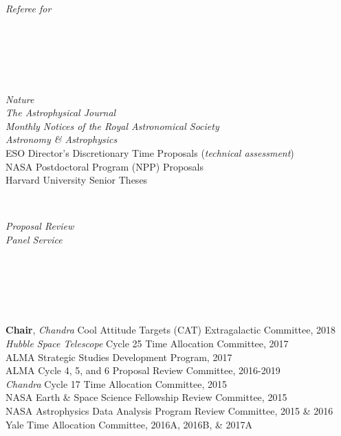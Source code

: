 \documentclass[11pt]{article}
\begin{document}
\vspace{4mm}


\hspace{2.5mm} \parbox{1.5in}{\textit{Referee for \\\\\\\\\\\\}} \parbox{5.15in}{
\textit{Nature}\\
\textit{The Astrophysical Journal}\\
\textit{Monthly Notices of the Royal Astronomical Society}\\
\textit{Astronomy \& Astrophysics}\\
ESO Director's Discretionary Time Proposals (\textit{technical assessment}) \\
NASA Postdoctoral Program (NPP) Proposals \\
Harvard University Senior Theses} \\

\vspace{4mm}


\hspace{2.5mm} \parbox{1.5in}{\textit{Proposal Review \\ Panel Service \\\\\\\\\\\\}} \parbox{5.15in}{
\textbf{Chair}, \textit{Chandra} Cool Attitude Targets (CAT) Extragalactic Committee, 2018\\
\textit{Hubble Space Telescope} Cycle 25 Time Allocation Committee, 2017 \\
ALMA Strategic Studies Development Program, 2017 \\
ALMA Cycle 4, 5, and 6 Proposal Review Committee, 2016-2019 \\\textit{Chandra} Cycle 17 Time Allocation Committee, 2015  \\ NASA Earth \& Space Science Fellowship Review Committee, 2015 \\
NASA Astrophysics Data Analysis Program Review Committee, 2015 \& 2016 \\
Yale Time Allocation Committee, 2016A, 2016B, \& 2017A} \\

\vspace{4mm}
\end{document}
